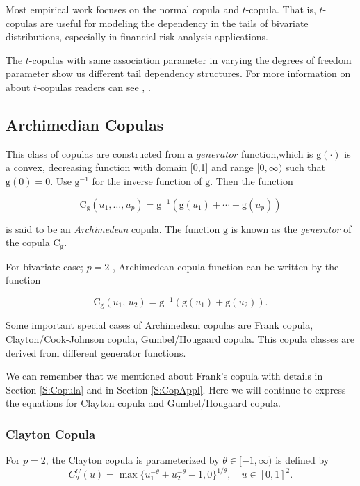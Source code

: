 \documentclass[]{book}
\theoremstyle{definition}
\theoremstyle{definition}
\theoremstyle{definition}
\theoremstyle{remark}
\begin{document}
Most empirical work focuses on the normal copula and \(t\)-copula. That
is, \(t\)-copulas are useful for modeling the dependency in the tails of
bivariate distributions, especially in financial risk analysis
applications.

The \(t\)-copulas with same association parameter in varying the degrees
of freedom parameter show us different tail dependency structures. For
more information on about \(t\)-copulas readers can see
\citep{joe2014dependence}, \citep{hofertelements}.

\subsection{Archimedian Copulas}\label{archimedian-copulas}

This class of copulas are constructed from a \(generator\)
function,which is \(\mathrm{g}(\cdot)\) is a convex, decreasing function
with domain {[}0,1{]} and range \([0, \infty)\) such that
\(\mathrm{g}(0)=0\). Use \(\mathrm{g}^{-1}\) for the inverse function of
\(\mathrm{g}\). Then the function

\[\mathrm{C}_{\mathrm{g}}(u_1, \ldots, u_p) = \mathrm{g}^{-1} \left(\mathrm{g}(u_1)+ \cdots + \mathrm{g}(u_p) \right)\]

is said to be an \emph{Archimedean} copula. The function \(\mathrm{g}\)
is known as the \emph{generator} of the copula
\(\mathrm{C}_{\mathrm{g}}\).

For bivariate case; \(p=2\) , Archimedean copula function can be written
by the function

\[\mathrm{C}_{\mathrm{g}}(u_1, \, u_2) = \mathrm{g}^{-1} \left(\mathrm{g}(u_1) + \mathrm{g}(u_2) \right).\]

Some important special cases of Archimedean copulas are Frank copula,
Clayton/Cook-Johnson copula, Gumbel/Hougaard copula. This copula classes
are derived from different generator functions.

We can remember that we mentioned about Frank's copula with details in
Section \ref{S:Copula} and in Section \ref{S:CopAppl}. Here we will
continue to express the equations for Clayton copula and Gumbel/Hougaard
copula.

\subsubsection{Clayton Copula}\label{clayton-copula}

For \(p=2\), the Clayton copula is parameterized by
\(\theta \in [-1,\infty)\) is defined by
\[C_{\theta}^C(u)=\max\{u_1^{-\theta}+u_2^{-\theta}-1,0\}^{1/\theta}, \quad u\in[0,1]^2.\]
\end{document}
